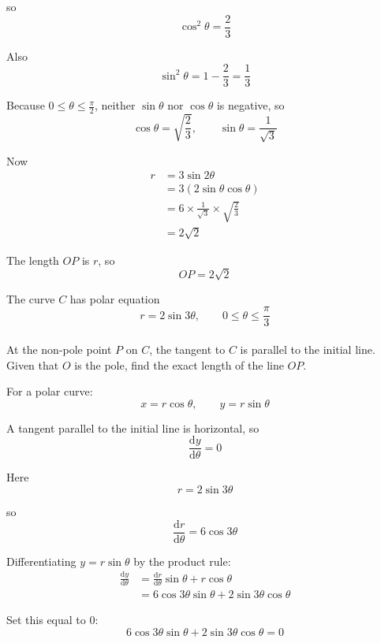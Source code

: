 \documentclass[leqno]{article}
\begin{document}
\begin{enumerate}[
  label=\textbf{\arabic*.},
  leftmargin=*,
  topsep=0pt,
  partopsep=0pt,
  parsep=0pt
]
\begin{djsSolution}
so
\[
\cos^2\theta=\frac{2}{3}
\]

Also
\[
\sin^2\theta=1-\frac{2}{3}=\frac{1}{3}
\]

Because \(0\leq\theta\leq\frac{\pi}{2}\), neither \(\sin\theta\) nor \(\cos\theta\) is negative, so
\[
\cos\theta=\sqrt{\frac{2}{3}},
\qquad
\sin\theta=\frac{1}{\sqrt{3}}
\]

Now
\begin{align*}
r&=3\sin 2\theta\\
&=3(2\sin\theta\cos\theta)\\
&=6\times \frac{1}{\sqrt{3}}\times \sqrt{\frac{2}{3}}\\
&=2\sqrt{2}
\end{align*}

The length \(OP\) is \(r\), so
\[
OP=2\sqrt{2}
\]
\end{djsSolution}


\newpage

\questionitem

The curve $C$ has polar equation
\[
r = 2\sin 3\theta, \qquad 0 \leq \theta \leq \frac{\pi}{3}
\]
\\
At the non-pole point $P$ on $C$, the tangent to $C$ is parallel to the initial line. \\

Given that $O$ is the pole, find the exact length of the line $OP$. 

\vspace*{10pt}

\begin{djsSolution}
For a polar curve:
\[
x=r\cos\theta,\qquad y=r\sin\theta
\]

A tangent parallel to the initial line is horizontal, so
\[
\frac{\mathrm{d}y}{\mathrm{d}\theta}=0
\]

Here
\[
r=2\sin 3\theta
\]

so
\[
\frac{\mathrm{d}r}{\mathrm{d}\theta}=6\cos 3\theta
\]

Differentiating \(y=r\sin\theta\) by the product rule:
\begin{align*}
\frac{\mathrm{d}y}{\mathrm{d}\theta}
&=\frac{\mathrm{d}r}{\mathrm{d}\theta}\sin\theta+r\cos\theta \\
&=6\cos 3\theta \sin\theta+2\sin 3\theta \cos\theta
\end{align*}

Set this equal to \(0\):
\[
6\cos 3\theta \sin\theta+2\sin 3\theta \cos\theta=0
\]


\end{djsSolution}
\end{enumerate}
\end{document}
